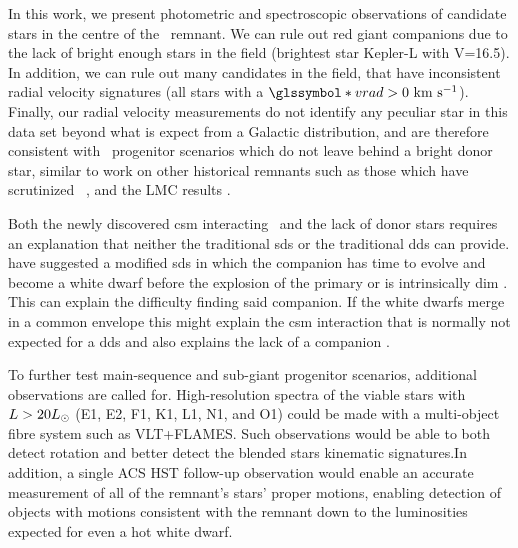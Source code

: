\documentclass[preprint2]{aastex}
\begin{document}
\label{sec:conclusion}

In this work, we present photometric and spectroscopic observations of candidate stars in the centre of the \ remnant. We can rule out red giant companions due to the lack of bright enough stars in the field (brightest star Kepler-L with V=16.5). In addition, we can rule out many candidates in the field, that have inconsistent radial velocity signatures (all stars with a $\vrad>0~\kms$). Finally, our radial velocity measurements do not identify any peculiar star in this data set beyond what is expect from a Galactic distribution, and are therefore consistent with \snia\ progenitor scenarios which do not leave behind a bright donor star, similar to work on other historical remnants such as those which have scrutinized \ \citep{2012Natur.489..533G,2012ApJ...759....7K}, and the LMC results \citep{2012ApJ...747L..19E, 2012Natur.481..164S}. 

Both the newly discovered \gls{csm} interacting \sneia\ and the lack of donor stars requires an explanation that neither the traditional \gls{sds} or the traditional \gls{dds} can provide. \citet{2011ApJ...730L..34J,2011ApJ...738L...1D,2012ApJ...744...69H,2012ApJ...756L...4H} have suggested a modified \gls{sds} in which the companion has time to evolve and become a white dwarf before the explosion of the primary or is intrinsically dim \citep{2012ApJ...758..123W}. This can explain the difficulty finding said companion. If the white dwarfs merge in a common envelope this might explain the \gls{csm} interaction that is normally not expected for a \gls{dds} and also explains the lack of a companion \citep[][, van Kerkwijk priv. comm. ]{2011MNRAS.417.1466K}.  

To further test main-sequence and sub-giant progenitor scenarios, additional observations are called for. High-resolution spectra of the viable stars with $L>20\hbox{$L_{\odot}$}$ (E1, E2, F1, K1, L1, N1, and O1) could be made with a multi-object fibre system such as VLT+FLAMES. Such observations would be able to both detect rotation and better detect the blended stars kinematic signatures.In addition, a single ACS HST follow-up observation would enable an accurate measurement of all of the remnant's stars' proper motions, enabling detection of objects with motions consistent with the remnant down to the luminosities expected for even a hot white dwarf. 
\end{document}
